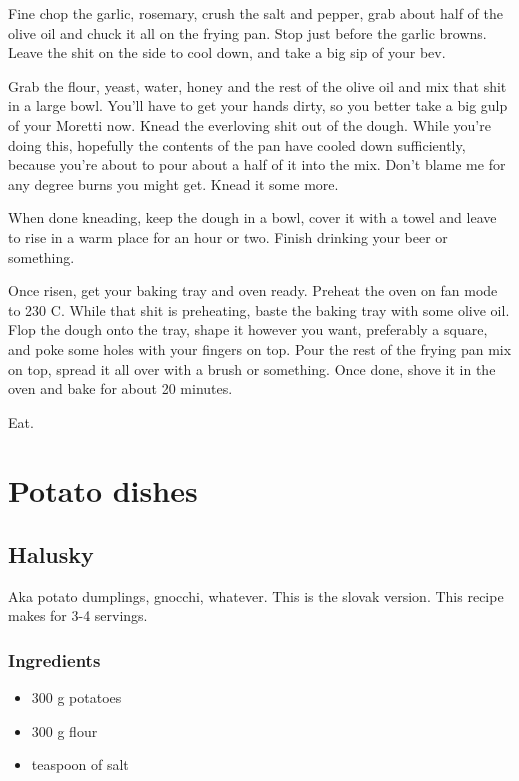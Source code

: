 \documentclass[10pt]{article}
\begin{document}
Fine chop the garlic, rosemary, crush the salt and pepper, grab about half of the olive oil and chuck it all on the frying pan. Stop just before the garlic browns. Leave the shit on the side to cool down, and take  a big sip of your bev. \par

Grab the flour, yeast, water, honey and the rest of the olive oil and mix that shit in a large bowl. You'll have to get your hands dirty, so you better take a big gulp of your Moretti now. Knead the everloving shit out of the dough. While you're doing this, hopefully the contents of the pan have cooled down sufficiently, because you're about to pour about a half of it into the mix. Don't blame me for any degree burns you might get. Knead it some more. \par

When done kneading, keep the dough in a bowl, cover it with a towel and leave to rise in a warm place for an hour or two. Finish drinking your beer or something. \par

Once risen, get your baking tray and oven ready. Preheat the oven on fan mode to 230 C. While that shit is preheating, baste the baking tray with some olive oil. Flop the dough onto the tray, shape it however you want, preferably a square, and poke some holes with your fingers on top. Pour the rest of the frying pan mix on top, spread it all over with a brush or something. Once done, shove it in the oven and bake for about 20 minutes. \par

Eat.
\section{Potato dishes}%
\label{sec:potato_dishes}

\subsection{Halusky}%
\label{sub:halusky}

Aka potato dumplings, gnocchi, whatever. This is the slovak version. This recipe makes for 3-4 servings.
\subsubsection{Ingredients}%
\label{ssub:halusky_ingredients}
\begin{itemize}
	\item 300 g potatoes
	\item 300 g flour
	\item teaspoon of salt
\end{itemize}
\end{document}
